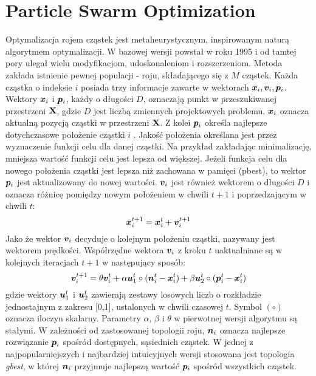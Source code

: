 \section{Particle Swarm Optimization} \label{sect:pso_def}
Optymalizacja rojem cząstek  jest metaheurystycznym, inspirowanym naturą algorytmem optymalizacji. W bazowej wersji powstał w roku 1995 \parencite{Kennedy1995a,Eberhart1995} i od tamtej pory ulegał wielu modyfikacjom, udoskonaleniom i rozszerzeniom. Metoda zakłada istnienie pewnej populacji - roju, składającego się z $M$ cząstek. Każda cząstka o indeksie $i$ posiada trzy informacje zawarte w wektorach $\bm{x}_i,\bm{v}_i,\bm{p}_i$. Wektory $\bm{x}_i$ i $\bm{p}_i$, każdy o długości $D$, oznaczają punkt w przeszukiwanej przestrzeni $\mathbf{X}$, gdzie $D$ jest liczbą zmiennych projektowych problemu. $\bm{x}_i$ oznacza aktualną pozycją cząstki w przestrzeni $\mathbf{X}$. Z kolei $\bm{p}_i$ określa najlepsze dotychczasowe położenie cząstki $i$ . Jakość położenia określana jest przez wyznaczenie funkcji celu dla danej cząstki. Na przykład zakładając minimalizację, mniejsza wartość funkcji celu jest lepsza od większej. Jeżeli funkcja celu dla nowego położenia cząstki jest lepsza niż zachowana w pamięci (pbest), to wektor $\bm{p}_i$ jest aktualizowany do nowej wartości. $\bm{v}_i$ jest również wektorem o długości $D$ i oznacza różnicę pomiędzy nowym położeniem w chwili $t+1$ i poprzedzającym w chwili $t$:
\begin{equation} \label{eq: pso_position}
	\bm{x}_i^{t+1}=\bm{x}_i^t+\bm{v}_i^{t+1}
\end{equation}
 Jako że wektor $\bm{v}_i$ decyduje o kolejnym położeniu cząstki, nazywany jest wektorem prędkości. Współrzędne wektora $\bm{v}_i$ z kroku $t$ uaktualniane są w kolejnych iteracjach $t+1$ w następujący sposób:
\begin{equation} \label{eq: pso_velocity}
	\bm{v}_{i}^{t+1}=\theta\bm{v}_i^t+\alpha\bm{u}_1^t\circ (\bm{n}_i^t-\bm{x}_i^t)+\beta\bm{u}_2^t\circ(\bm{p}_i^t-\bm{x}_i^t)
\end{equation}
gdzie wektory $\bm{u}_1^t$ i $\bm{u}_2^t$ zawierają zestawy losowych liczb o rozkładzie jednostajnym z zakresu [0,1], ustalonych w chwili czasowej $t$. Symbol $(\circ)$ oznacza iloczyn skalarny. Parametry $\alpha$, $\beta$ i $\theta$ w pierwotnej wersji algorytmu są stałymi. W zależności od zastosowanej topologii roju, $\bm{n}_i$ oznacza najlepsze rozwiązanie $\bm{p}_i$ spośród dostępnych, sąsiednich cząstek. W jednej z najpopularniejszych i najbardziej intuicyjnych wersji stosowana jest topologia \textit{gbest}, w której $\bm{n}_i$ przyjmuje najlepszą wartość $\bm{p}_i$ spośród wszystkich cząstek.
